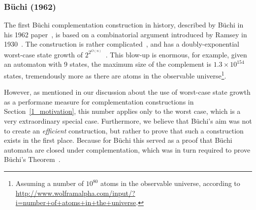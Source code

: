 

\subsubsection{Büchi (1962)}
\label{2_buchi62}
The first Büchi complementation construction in history, described by Büchi in his 1962 paper~\cite{buchi1960decision}, is based on a combinatorial argument introduced by Ramsey in 1930~\cite{1930ramsey}. The construction is rather complicated~\cite{vardi2005buchi}, and has a doubly-exponential worst-case state growth of $2^{2^{O\left(n\right)}}$~\cite{2007_vardi}. This blow-up is enormous, for example, given an automaton with 9 states, the maximum size of the complement is $1.3 \times 10^{154}$ states, tremendously more as there are atoms in the observable universe\footnote{Assuming a number of $10^{80}$ atoms in the observable universe, according to \url{http://www.wolframalpha.com/input/?i=number+of+atoms+in+the+universe}.}.

However, as mentioned in our discussion about the use of worst-case state growth as a performane measure for complementation constructions in Section~\ref{1_motivation}, this number applies only to the worst case, which is a very extraordinary special case. Furthermore, we believe that Büchi's aim was not to create an \textit{efficient} construction, but rather to prove that such a construction exists in the first place. Because for Büchi this served as a proof that Büchi automata are closed under complementation, which was in turn required to prove Büchi's Theorem~\cite{vardi2007automata}.



